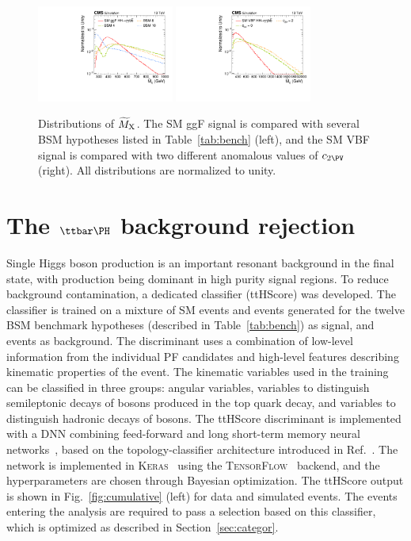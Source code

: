 \documentclass[11pt,twoside,a4paper,cmspaper,final,collab]{cms-tdr}
\begin{document}
\begin{figure}[hbt!]
\centering
\includegraphics[width=0.4\textwidth]{Figure_004-a.pdf}
\includegraphics[width=0.4\textwidth]{Figure_004-b.pdf}
\caption{Distributions of $\widetilde{M}_{\mathrm{X}}$. The SM ggF \HH
signal is compared with several BSM hypotheses listed in Table~\ref{tab:bench} (left),
and the SM VBF \HH signal is compared with two different anomalous values of $\ctwov$ (right). All distributions are normalized to unity.}
\label{fig:mx}\end{figure}


\section{The \texorpdfstring{$\ttH$}{ttH} background rejection}
\label{sec:ttHDiscSec}
Single Higgs boson production is an important resonant background in the \bbgg final state, with \ttH production being dominant in high purity signal regions. To reduce \ttH background contamination, a dedicated classifier (\mbox{ttHScore}) was developed. The classifier is trained on a mixture of SM \HH events and events generated for the twelve BSM benchmark hypotheses (described in Table~\ref{tab:bench}) as signal, and \ttH events as background. The discriminant uses a combination of low-level information from the individual PF candidates and high-level features describing kinematic properties of the event. The kinematic variables used in the training can be classified in three groups: angular variables, variables to distinguish semileptonic decays of \PW bosons produced in the top quark decay, and variables to distinguish hadronic decays of \PW bosons. The \mbox{ttHScore} discriminant is implemented with a DNN 
combining feed-forward and long short-term memory neural networks~\cite{Schmidhuber}, based on the topology-classifier architecture introduced in Ref.~\cite{Nguyen:2018ugw}. The network is implemented in \textsc{Keras}~\cite{chollet2015keras} using the \textsc{TensorFlow}~\cite{tensorflow2015-whitepaper} backend, and the hyperparameters are chosen through Bayesian optimization. 
The \mbox{ttHScore} output is shown in Fig.~\ref{fig:cumulative} (left) for data and simulated events. 
The events entering the analysis are required to pass a selection based on this classifier, which is optimized as described in Section~\ref{sec:categor}.
\end{document}
